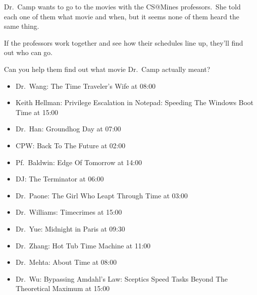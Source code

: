 \documentclass{puzz}
\begin{document}

Dr.~Camp wants to go to the movies with the CS@Mines professors.~She told each
one of them what movie and when, but it seems none of them heard the same
thing.

If the professors work together and see how their schedules line up, they'll
find out who can go.

Can you help them find out what movie Dr.~Camp actually meant?

\begin{itemize}
\item Dr.~Wang: The Time Traveler's Wife at 08:00
\item Keith Hellman: Privilege Escalation in Notepad: Speeding The Windows Boot Time at 15:00
\item Dr.~Han: Groundhog Day at 07:00
\item CPW: Back To The Future at 02:00
\item Pf.~Baldwin: Edge Of Tomorrow at 14:00
\item DJ: The Terminator at 06:00
\item Dr.~Paone: The Girl Who Leapt Through Time at 03:00
\item Dr.~Williams: Timecrimes at 15:00
\item Dr.~Yue: Midnight in Paris at 09:30
\item Dr.~Zhang: Hot Tub Time Machine at 11:00
\item Dr.~Mehta: About Time at 08:00
\item Dr.~Wu: Bypassing Amdahl's Law: Sceptics Speed Tasks Beyond The Theoretical Maximum at 15:00
\end{itemize}
\end{document}
